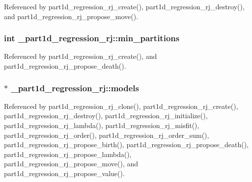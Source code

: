 Referenced by part1d\+\_\+regression\+\_\+rj\+\_\+create(), part1d\+\_\+regression\+\_\+rj\+\_\+destroy(), and part1d\+\_\+regression\+\_\+rj\+\_\+propose\+\_\+move().

\subsubsection[{\texorpdfstring{min\+\_\+partitions}{min_partitions}}]{\setlength{\rightskip}{0pt plus 5cm}int \+\_\+part1d\+\_\+regression\+\_\+rj\+::min\+\_\+partitions}\hypertarget{struct__part1d__regression__rj_a44ee0bfc943a76c8a9dbd8acb87aeffd}{}\label{struct__part1d__regression__rj_a44ee0bfc943a76c8a9dbd8acb87aeffd}


Referenced by part1d\+\_\+regression\+\_\+rj\+\_\+create(), and part1d\+\_\+regression\+\_\+rj\+\_\+propose\+\_\+death().

\subsubsection[{\texorpdfstring{models}{models}}]{$\ast$ \+\_\+part1d\+\_\+regression\+\_\+rj\+::models}\hypertarget{struct__part1d__regression__rj_af8bd77cda8a8eb5ae298eff20676f960}{}\label{struct__part1d__regression__rj_af8bd77cda8a8eb5ae298eff20676f960}


Referenced by part1d\+\_\+regression\+\_\+rj\+\_\+clone(), part1d\+\_\+regression\+\_\+rj\+\_\+create(), part1d\+\_\+regression\+\_\+rj\+\_\+destroy(), part1d\+\_\+regression\+\_\+rj\+\_\+initialize(), part1d\+\_\+regression\+\_\+rj\+\_\+lambda(), part1d\+\_\+regression\+\_\+rj\+\_\+misfit(), part1d\+\_\+regression\+\_\+rj\+\_\+order(), part1d\+\_\+regression\+\_\+rj\+\_\+order\+\_\+sum(), part1d\+\_\+regression\+\_\+rj\+\_\+propose\+\_\+birth(), part1d\+\_\+regression\+\_\+rj\+\_\+propose\+\_\+death(), part1d\+\_\+regression\+\_\+rj\+\_\+propose\+\_\+lambda(), part1d\+\_\+regression\+\_\+rj\+\_\+propose\+\_\+move(), and part1d\+\_\+regression\+\_\+rj\+\_\+propose\+\_\+value().

